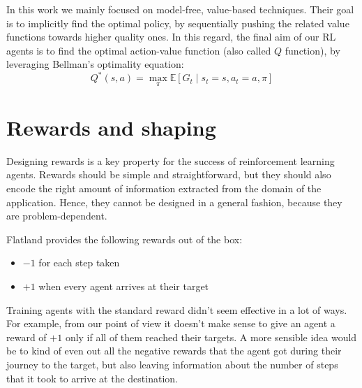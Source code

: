 \documentclass[a4paper,10pt]{report}
\begin{document}
In this work we mainly focused on model-free, value-based techniques. Their goal is to implicitly find the optimal policy, by sequentially pushing the related value functions towards higher quality ones. In this regard, the final aim of our RL agents is to find the optimal action-value function (also called $Q$ function), by leveraging Bellman's optimality equation:
$$
Q^*(s,a)=\max_\pi\mathbb{E}\left[G_t\mid s_t=s,a_t=a,\pi\right]
$$

\section{Rewards and shaping}
Designing rewards is a key property for the success of reinforcement learning agents. Rewards should be simple and straightforward, but they should also encode the right amount of information extracted from the domain of the application. Hence, they cannot be designed in a general fashion, because they are problem-dependent.

Flatland provides the following rewards out of the box:
\begin{itemize}
	\item $-1$ for each step taken
	\item $+1$ when every agent arrives at their target
\end{itemize}

Training agents with the standard reward didn't seem effective in a lot of ways. For example, from our point of view it doesn't make sense to give an agent a reward of $+1$ only if all of them reached their targets. A more sensible idea would be to kind of even out all the negative rewards that the agent got during their journey to the target, but also leaving information about the number of steps that it took to arrive at the destination. 
\end{document}

